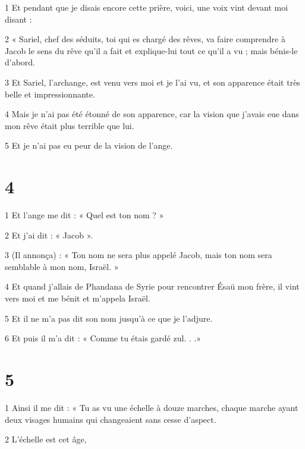 \par 1 Et pendant que je disais encore cette prière, voici, une voix vint devant moi disant :

\par 2 « Sariel, chef des séduits, toi qui es chargé des rêves, va faire comprendre à Jacob le sens du rêve qu'il a fait et explique-lui tout ce qu'il a vu ; mais bénis-le d’abord.

\par 3 Et Sariel, l'archange, est venu vers moi et je l'ai vu, et son apparence était très belle et impressionnante.

\par 4 Mais je n'ai pas été étonné de son apparence, car la vision que j'avais eue dans mon rêve était plus terrible que lui.

\par 5 Et je n'ai pas eu peur de la vision de l'ange.

\chapter{4}

\par 1 Et l'ange me dit : « Quel est ton nom ? »

\par 2 Et j’ai dit : « Jacob ».

\par 3 (Il annonça) : « Ton nom ne sera plus appelé Jacob, mais ton nom sera semblable à mon nom, Israël. »

\par 4 Et quand j'allais de Phandana de Syrie pour rencontrer Ésaü mon frère, il vint vers moi et me bénit et m'appela Israël.

\par 5 Et il ne m'a pas dit son nom jusqu'à ce que je l'adjure.

\par 6 Et puis il m'a dit : « Comme tu étais gardé zul. . .»

\chapter{5}

\par 1 Ainsi il me dit : « Tu as vu une échelle à douze marches, chaque marche ayant deux visages humains qui changeaient sans cesse d'aspect.

\par 2 L'échelle est cet âge,

